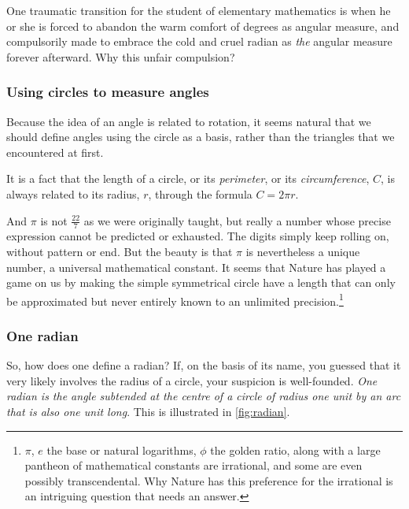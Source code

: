 \documentclass[
  a4paper,
]{article}
\begin{document}
One traumatic transition for the student of elementary mathematics is
when he or she is forced to abandon the warm comfort of degrees as
angular measure, and compulsorily made to embrace the cold and cruel
radian as \emph{the} angular measure forever afterward. Why this unfair
compulsion?

\hypertarget{using-circles-to-measure-angles}{%
\subsubsection{Using circles to measure
angles}\label{using-circles-to-measure-angles}}

Because the idea of an angle is related to rotation, it seems natural
that we should define angles using the circle as a basis, rather than
the triangles that we encountered at first.

It is a fact that the length of a circle, or its \emph{perimeter}, or
its \emph{circumference}, \(C\), is always related to its radius, \(r\),
through the formula \(C = 2\pi r\).

And \(\pi\) is not \(\frac{22}{7}\) as we were originally taught, but
really a number whose precise expression cannot be predicted or
exhausted. The digits simply keep rolling on, without pattern or end.
But the beauty is that \(\pi\) is nevertheless a unique number, a
universal mathematical constant. It seems that Nature has played a game
on us by making the simple symmetrical circle have a length that can
only be approximated but never entirely known to an unlimited
precision.\footnote{\(\pi\), \(e\) the base or natural logarithms,
  \(\phi\) the golden ratio, along with a large pantheon of mathematical
  constants are irrational, and some are even possibly transcendental.
  Why Nature has this preference for the irrational is an intriguing
  question that needs an answer.}

\hypertarget{one-radian}{%
\subsubsection{One radian}\label{one-radian}}

So, how does one define a radian? If, on the basis of its name, you
guessed that it very likely involves the radius of a circle, your
suspicion is well-founded. \emph{One radian is the angle subtended at
the centre of a circle of radius one unit by an arc that is also one
unit long}. This is illustrated in \cref{fig:radian}.
\end{document}
